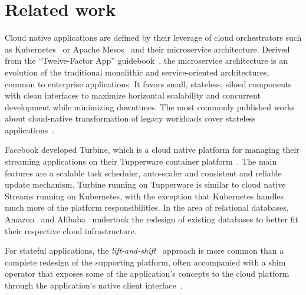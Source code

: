 \section{Related work}

Cloud native applications are defined by their leverage of cloud orchestrators
such as Kubernetes~\cite{kube} or Apache Mesos~\cite{mesos} and their
microservice architecture. Derived from the ``Twelve-Factor App''
guidebook~\cite{12factor}, the microservice architecture is an evolution of the
traditional monolithic and service-oriented architectures, common to enterprise
applications. It favors small, stateless, siloed components with clean
interfaces to maximize horizontal scalability and concurrent development
while minimizing downtimes. The most commonly
published works about cloud-native transformation of legacy workloads cover
stateless applications~\cite{8629101,8457916,8457847,10.1145/3104028,10.1145/3241403.3241440,8004166,KRATZKE20171,7584353,7436659}.

Facebook developed Turbine, which is a cloud native platform for managing their
streaming applications on their Tupperware container
platform~\cite{turbine-2020}.  The main features are a scalable task scheduler,
auto-scaler and consistent and reliable update mechanism. Turbine running on
Tupperware is similar to cloud native Streams running on Kubernetes, with the
exception that Kubernetes handles much more of the platform responsibilities. In
the area of relational databases, {Amazon}~\cite{10.1145/3035918.3056101} and
{Alibaba}~\cite{10.14778/3352063.3352141} undertook the redesign of existing
databases to better fit their respective cloud infrastructure.

For stateful applications, the \emph{lift-and-shift}~\cite{liftshift} approach
is more common than a complete redesign of the supporting platform, often
accompanied with a shim operator that exposes some of the application's concepts
to the cloud platform through the application's native client
interface~\cite{FlinkOperator,BanzaiKafka,StrimziKafka}.

